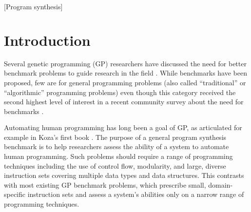 \documentclass{sig-alternate}
\begin{document}
[Program synthesis]




\section{Introduction}

Several genetic programming (GP) researchers have discussed the need for better benchmark problems to guide research in the field \cite{McDermott:2012:GECCO, White:2013:BGB:2441218.2441242}. While benchmarks have been proposed, few are for general programming problems (also called ``traditional'' or ``algorithmic'' programming problems) even though this category received the second highest level of interest in a recent community survey about the need for benchmarks \cite{White:2013:BGB:2441218.2441242}. 


Automating human programming has long been a goal of GP, as articulated for example in Koza's first book \cite{koza:book}. The purpose of a general program synthesis benchmark is to help researchers assess the ability of a system to automate human programming. Such problems should require a range of programming techniques including the use of control flow, modularity, and large, diverse instruction sets covering multiple data types and data structures. This contrasts with most existing GP benchmark problems, which prescribe small, domain-specific instruction sets and assess a system's abilities only on a narrow range of programming techniques.
\end{document}
